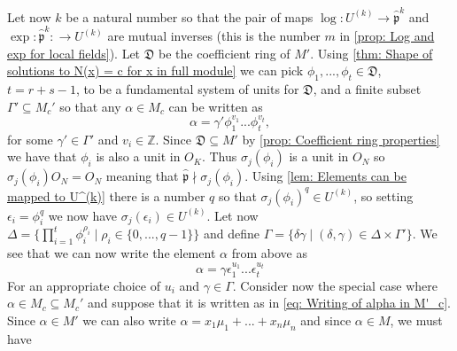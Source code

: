 \documentclass{article}
\newcommand{\mfrak}[1]{\mathfrak{#1}}
\newcommand{\mbb}[1]{\mathbb{#1}}
\begin{document}
Let now $k$ be a natural number so that the pair of maps $\log : U^{(k)} \to \hat {\mfrak p}^k$ 
and $\exp : \hat {\mfrak p}^k : \to U^{(k)}$ are mutual inverses (this is the number $m$ in \cref{prop: Log and exp for local fields}). Let $\mfrak D$ be the coefficient ring of $M'$. Using \cref{thm: Shape of solutions to N(x) = c for x in full module} we can pick $\phi_1, ..., \phi_t \in \mfrak D$, $t = r + s - 1$, to be a fundamental system of units for $\mfrak D$, and a finite subset $\Gamma' \subseteq M_c'$ so that any $\alpha \in M_c$ can be written as
$$\alpha = \gamma' \phi_1^{v_1} ... \phi_t^{v_t},$$
for some $\gamma' \in \Gamma'$ and $v_i \in \mbb Z$. Since $\mfrak D \subseteq M'$ by \cref{prop: Coefficient ring properties} we have that $\phi_i$ is also a unit in $O_K$. Thus $\sigma_j(\phi_i)$ is a unit in $O_N$ so $\sigma_j(\phi_i) O_N = O_N$ meaning that $\hat {\mfrak p} \nmid \sigma_j(\phi_i)$. Using \cref{lem: Elements can be mapped to U^(k)} there is a number $q$ so that $\sigma_j(\phi_i)^q \in U^{(k)}$, so setting $\epsilon_i = \phi_i^q$ we now have $\sigma_j(\epsilon_i) \in U^{(k)}$. Let now $\Delta = \{\prod_{i = 1}^t \phi_i^{\rho_i} \mid \rho_i \in \{0, ..., q-1 \} \}$ and define $\Gamma = \{\delta \gamma \mid (\delta, \gamma) \in \Delta \times \Gamma' \}$. We see that we can now write the element $\alpha$ from above as
\begin{equation}\label{eq: Writing of alpha in M'_c}
    \alpha = \gamma \epsilon_1^{u_1} ... \epsilon_t^{u_t}
\end{equation}
For an appropriate choice of $u_i$ and $\gamma \in \Gamma$. Consider now the special case where $\alpha \in M_c \subseteq M_c'$ and suppose that it is written as in \cref{eq: Writing of alpha in M'_c}. Since $\alpha \in M'$ we can also write 
$\alpha = x_1 \mu_1 + ... + x_n \mu_n$ and since $\alpha \in M$, we must have 
\end{document}
